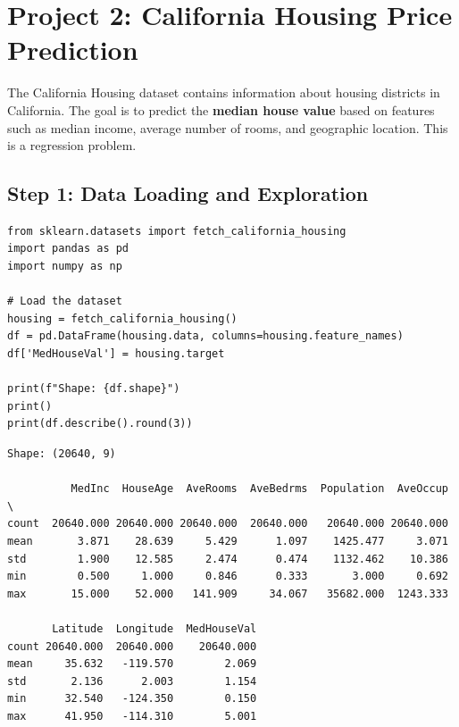 \section{Project 2: California Housing Price Prediction}
\label{sec:projet_california}


\begin{intuition}
The California Housing dataset contains information about housing districts in California. The goal is to predict the \textbf{median house value} based on features such as median income, average number of rooms, and geographic location. This is a regression problem.
\end{intuition}

\subsection{Step 1: Data Loading and Exploration}

\begin{codeblock}[title=\textbf{Python}]
\begin{verbatim}
from sklearn.datasets import fetch_california_housing
import pandas as pd
import numpy as np

# Load the dataset
housing = fetch_california_housing()
df = pd.DataFrame(housing.data, columns=housing.feature_names)
df['MedHouseVal'] = housing.target

print(f"Shape: {df.shape}")
print()
print(df.describe().round(3))
\end{verbatim}
\end{codeblock}

\begin{codeoutput}
\begin{verbatim}
Shape: (20640, 9)

          MedInc  HouseAge  AveRooms  AveBedrms  Population  AveOccup  \
count  20640.000 20640.000 20640.000  20640.000   20640.000 20640.000
mean       3.871    28.639     5.429      1.097    1425.477     3.071
std        1.900    12.585     2.474      0.474    1132.462    10.386
min        0.500     1.000     0.846      0.333       3.000     0.692
max       15.000    52.000   141.909     34.067   35682.000  1243.333

       Latitude  Longitude  MedHouseVal
count 20640.000  20640.000    20640.000
mean     35.632   -119.570        2.069
std       2.136      2.003        1.154
min      32.540   -124.350        0.150
max      41.950   -114.310        5.001
\end{verbatim}
\end{codeoutput}

